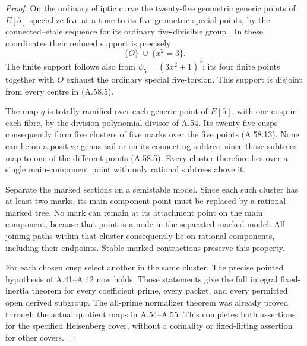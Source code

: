 \begin{proof}
On the ordinary elliptic curve the twenty-five geometric
generic points of \(E[5]\) specialize five at a time
to its five geometric special points, by the connected--etale
sequence for its ordinary five-divisible group
\cite[Sections 1.4 and 2.2]{fghTate1967Pdivisible}.
In these coordinates
their reduced support is precisely
\[
                    \{O\}\ \cup\ \{x^2=3\}.          \tag{A.58.13}
\]
The finite support follows also from
\(\overline\psi _5=(3x^2+1)^5\); its four finite
points together with \(O\) exhaust the ordinary
special five-torsion. This support is disjoint from
every centre in (A.58.5).

The map \(q\) is totally ramified over each generic
point of \(E[5]\), with one cusp in each fibre, by
the division-polynomial divisor of A.54. Its twenty-five
cusps consequently form five clusters of five marks over
the five points (A.58.13). None can lie on a positive-genus
tail or on its connecting subtree, since those subtrees
map to one of the different points (A.58.5).
Every cluster therefore lies over a single main-component
point with only rational subtrees above it.

Separate the marked sections on a semistable model. Since
each such cluster has at least two marks, its main-component
point must be replaced by a rational marked tree. No mark
can remain at its attachment point on the main component,
because that point is a node in the separated marked model.
All joining paths within that cluster consequently lie
on rational components, including their endpoints.
Stable marked contractions preserve this property.

For each chosen cusp select another in the same cluster.
The precise pointed hypothesis of A.41--A.42 now holds.
Those statements give the full integral fixed-inertia
theorem for every coefficient prime, every packet, and
every permitted open derived subgroup. The all-prime
normalizer theorem was already proved through the actual
quotient maps in A.54--A.55. This completes both assertions
for the specified Heisenberg cover, without a cofinality
or fixed-lifting assertion for other covers.
\end{proof}
